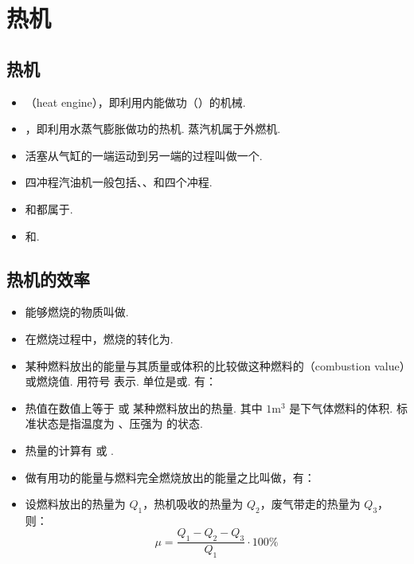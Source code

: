 \newpage
\section{热机}

\subsection{热机}
\vspace{10pt}
\begin{itemize}
\item {}（heat engine），即利用内能做功（）的机械.
\item {}，即利用水蒸气膨胀做功的热机. 蒸汽机属于外燃机.
\item 活塞从气缸的一端运动到另一端的过程叫做一个.
\item 四冲程汽油机一般包括、、和四个冲程.
\item {}和都属于.
\item {}和.
\end{itemize}

\subsection{热机的效率}
\vspace{10pt}
\begin{itemize}
\item 能够燃烧的物质叫做.
\item 在燃烧过程中，燃烧的转化为.
\item 某种燃料放出的能量与其质量或体积的比较做这种燃料的（combustion value）或燃烧值. 用符号  表示. 单位是或. 有：
\item 热值在数值上等于  或  某种燃料放出的热量. 其中 $1\text{m}^3$ 是下气体燃料的体积. 标准状态是指温度为 、压强为  的状态.
\item 热量的计算有  或 .
\item 做有用功的能量与燃料完全燃烧放出的能量之比叫做，有：
\item 设燃料放出的热量为 $Q_1$，热机吸收的热量为 $Q_2$，废气带走的热量为 $Q_3$，则：
$$
\mu=\frac{Q_1-Q_2-Q_3}{Q_1}\cdot100\%
$$
\end{itemize}